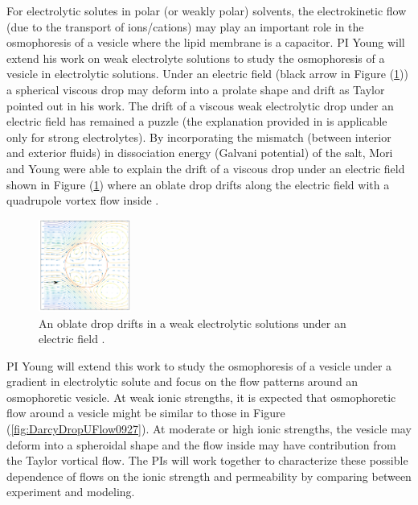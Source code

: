 \documentclass[11pt]{article}
\begin{document}
For electrolytic solutes in polar (or weakly polar) solvents, the electrokinetic flow (due to the transport of ions/cations)
may play an important role in the osmophoresis of a vesicle where the lipid membrane is a capacitor.  
PI Young will extend his work 
on weak electrolyte solutions \cite{Mori2017_arXiv} to study the osmophoresis of a vesicle 
in electrolytic solutions. Under an electric field (black arrow in Figure (\ref{fig:Mori_fig7})) a spherical viscous drop may deform into 
a prolate shape and drift as Taylor pointed out in his work. The drift of a viscous weak electrolytic drop under an electric field 
has remained a puzzle (the explanation provided in \cite{Schnitzer2015_JFM} is applicable only for strong electrolytes).
By incorporating the mismatch (between interior and exterior fluids) 
in dissociation energy (Galvani potential) of the salt, Mori and Young were able to explain the drift of a viscous drop under an electric field shown in Figure (\ref{fig:Mori_fig7}) where
an oblate drop drifts along the electric field with a quadrupole vortex flow inside \cite{Mori2017_arXiv}.
\begin{figure}
\vspace*{-10pt}
\centerline{\includegraphics[width=1.2in]{figs/Mori2017_arXiv_fig7a.pdf}}
\vspace*{-12pt}
\caption{\footnotesize An oblate drop drifts in a weak electrolytic solutions under an electric field \cite{Mori2017_arXiv}.}
\label{fig:Mori_fig7}
\end{figure}
% 

PI Young will extend this work to study the osmophoresis of a vesicle under a gradient in electrolytic solute and focus on the flow patterns around an osmophoretic vesicle. At weak
ionic strengths, it is expected that osmophoretic flow around a vesicle might be similar to those in Figure (\ref{fig:DarcyDropUFlow0927}). 
At moderate or high ionic strengths, the vesicle may deform into a spheroidal shape and the flow inside may have contribution from the Taylor vortical flow. The PIs will work together
to characterize these possible dependence of flows on the ionic strength and permeability by comparing between experiment and modeling.
\end{document}
